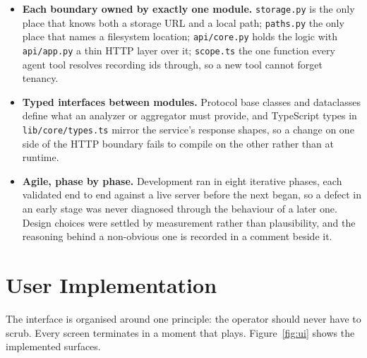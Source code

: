 \documentclass[11pt,a4paper]{article}
\begin{document}
\begin{itemize}
  \item \textbf{Each boundary owned by exactly one module.} \texttt{storage.py} is the
        only place that knows both a storage URL and a local path; \texttt{paths.py} the
        only place that names a filesystem location; \texttt{api/core.py} holds the logic
        with \texttt{api/app.py} a thin HTTP layer over it; \texttt{scope.ts} the one
        function every agent tool resolves recording ids through, so a new tool cannot
        forget tenancy.

  \item \textbf{Typed interfaces between modules.} Protocol base classes and dataclasses
        define what an analyzer or aggregator must provide, and TypeScript types in
        \texttt{lib/core/types.ts} mirror the service's response shapes, so a change on
        one side of the HTTP boundary fails to compile on the other rather than at runtime.

  \item \textbf{Agile, phase by phase.} Development ran in eight iterative phases, each
        validated end to end against a live server before the next began, so a defect in
        an early stage was never diagnosed through the behaviour of a later one. Design
        choices were settled by measurement rather than plausibility, and the reasoning
        behind a non-obvious one is recorded in a comment beside it.
\end{itemize}

\section{User Implementation}

The interface is organised around one principle: the operator should never have to scrub.
Every screen terminates in a moment that plays. Figure~\ref{fig:ui} shows the implemented
surfaces.

\end{document}
